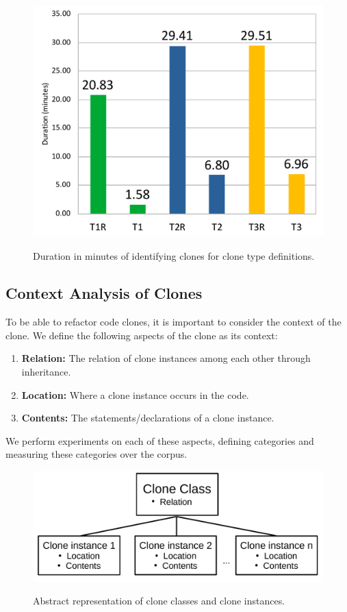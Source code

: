 \documentclass[a4paper]{article}
\begin{document}
\begin{figure}[H]
  \caption{Duration in minutes of identifying clones for clone type definitions.}
    \includegraphics[width=.95\columnwidth]{img/DurationChart}
  \label{fig:performance}
\end{figure}

\subsection{Context Analysis of Clones}\label{chap:clonecontextexpl}
To be able to refactor code clones, it is important to consider the context of the clone. We define the following aspects of the clone as its context:
\begin{enumerate}
  \item \textbf{Relation:} The relation of clone instances among each other through inheritance.
  \item \textbf{Location:} Where a clone instance occurs in the code.
  \item \textbf{Contents:} The statements/declarations of a clone instance.
\end{enumerate}
We perform experiments on each of these aspects, defining categories and measuring these categories over the corpus.

\begin{figure}[H]
  \caption{Abstract representation of clone classes and clone instances.}
    \medskip
    \includegraphics[width=1\columnwidth]{img/context}
  \label{fig:clonecontext}
\end{figure}
\end{document}
